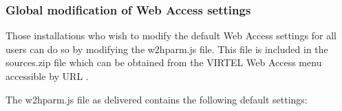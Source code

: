 \documentclass[letterpaper,10pt,english]{sphinxmanual}
\begin{document}
\begin{sphinxVerbatim}[commandchars=\\\{\}]
\end{sphinxVerbatim}


\subsubsection{Global modification of Web Access settings}
\label{\detokenize{User_Guide:global-modification-of-web-access-settings}}\label{\detokenize{User_Guide:v457ug-global-modifications}}
Those installations who wish to modify the default Web Access settings for all users can do so by modifying the w2hparm.js file. This file is included in the sources.zip file which can be obtained from the VIRTEL Web Access menu accessible by URL .

The w2hparm.js file as delivered contains the following default settings:
\end{document}
